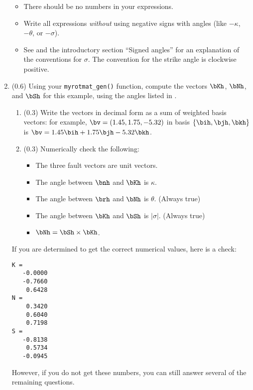 \documentclass[11pt,titlepage,fleqn]{article}
\newcommand{\rotvec}{\bv}      %
\begin{document}
\begin{enumerate}
\begin{itemize}
\item There should be no numbers in your expressions.

\item Write all expressions {\em without} using negative signs with angles (like $-\kappa$, $-\theta$, or $-\sigma$).

\item See  and the introductory section ``Signed angles'' for an explanation of the conventions for $\sigma$. The convention for the strike angle is clockwise positive.
\end{itemize}


\item (0.6) Using your \verb+myrotmat_gen()+ function, compute the vectors $\bKh$, $\bNh$, and $\bSh$ for this example, using the angles listed in .
%
\begin{enumerate}
\item (0.3) Write the vectors in decimal form as a sum of weighted basis vectors: for example, $\bv = (1.45,1.75,-5.32)$ in basis $\{\bih,\bjh,\bkh\}$ is $\rotvec = 1.45\bih + 1.75\bjh - 5.32\bkh$.

\item (0.3) Numerically check the following:
%
\begin{itemize}
\item The three fault vectors are unit vectors.
\item The angle between $\bnh$ and $\bKh$ is $\kappa$.
\item The angle between $\brh$ and $\bNh$ is $\theta$. (Always true)
\item The angle between $\bKh$ and $\bSh$ is $|\sigma|$. (Always true)
\item $\bNh = \bSh \times \bKh$.
\end{itemize}

\end{enumerate}
%
If you are determined to get the correct numerical values, here is a check:
%
\begin{verbatim}
K =
   -0.0000
   -0.7660
    0.6428
N =
    0.3420
    0.6040
    0.7198
S =
   -0.8138
    0.5734
   -0.0945
\end{verbatim}
%
However, if you do not get these numbers, you can still answer several of the remaining questions.



\end{enumerate}
\end{document}
